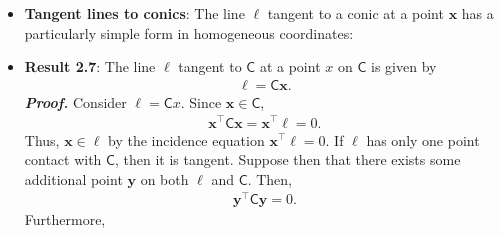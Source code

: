 \documentclass{report}
\begin{document}
\begin{itemize}
            \bigbreak \noindent 
            Stacking the constraints from five points we obtain
            \begin{align*}
                \begin{bmatrix}x_{1}^{2}&x_{1}y_{1}&y_{1}^{2}&x_{1}&y_{1}&1\\x_{2}^{2}&x_{2}y_{2}&y_{2}^{2}&x_{2}&y_{2}&1\\x_{3}^{2}&x_{3}y_{3}&y_{3}^{2}&x_{3}&y_{3}&1\\x_{4}^{2}&x_{4}y_{4}&y_{4}^{2}&x_{4}&y_{4}&1\\x_{5}^{2}&x_{5}y_{5}&y_{5}^{2}&x_{5}&y_{5}&1\end{bmatrix}\mathsf{c} = 0
            .\end{align*}
            and the conic is the null vector of this $5\times 6$ matrix. This shows that a conic is determined uniquely (up to scale) by five points in general position. The method of fitting a geometric entity (or relation) by determining a null space will be used frequently in the computation chapters throughout this book
        \item \textbf{Tangent lines to conics}: The line $\ell $ tangent to a conic at a point $\mathbf{x}$ has a particularly simple form in homogeneous coordinates:
        \item \textbf{Result 2.7}: The line $\ell$ tangent to $\mathsf{C}$ at a point $x$ on $\mathsf{C}$ is given by 
            \begin{align*}
                \mathbf{\ell} = \mathsf{C}\mathbf{x}
            .\end{align*}
            \textbf{\textit{Proof.}} Consider $\mathbf{\ell} = \mathsf{C}x$. Since $\mathbf{x} \in \mathsf{C}$,
            \begin{align*}
                \mathbf{x}^{\mathsf{\top}}\mathsf{C}\mathbf{x} = \mathbf{x}^{\mathsf{\top}}\mathbf{\ell}  = 0
            .\end{align*}
            Thus, $\mathbf{x} \in \mathbf{\ell}$ by the incidence equation $\mathbf{x}^{\mathsf{\top}}\mathbf{\ell} = 0$.
            \bigbreak \noindent 
            If $\mathbf{\ell}$ has only one point contact with $\mathsf{C}$, then it is tangent. Suppose then that there exists some additional point $\mathbf{y}$ on both $\mathbf{\ell}$ and $\mathsf{C}$. Then,
            \begin{align*}
                \mathbf{y}^{\mathsf{\top}}\mathsf{C}\mathbf{y} = 0
            .\end{align*}
            Furthermore,
            \begin{align*}

\end{align*}
\end{itemize}
\end{document}
